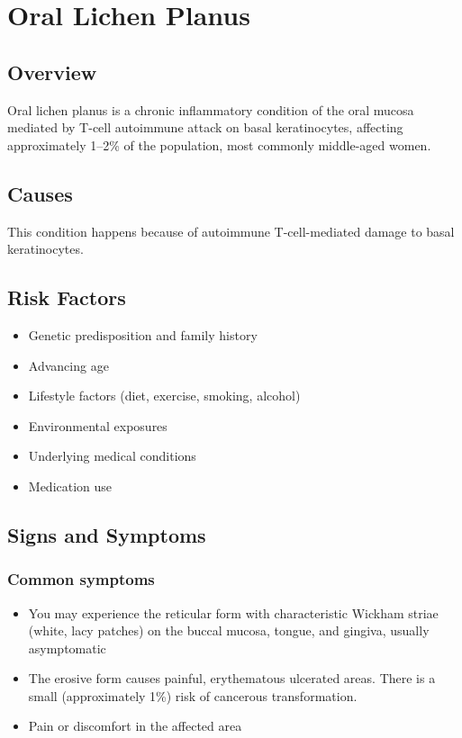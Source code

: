 \chapter{Oral Lichen Planus}
\label{sec:Oral Lichen Planus}

\section{Overview}
Oral lichen planus is a chronic inflammatory condition of the oral mucosa mediated by T-cell autoimmune attack on basal keratinocytes, affecting approximately 1--2\% of the population, most commonly middle-aged women.
\section{Causes}
This condition happens because of autoimmune T-cell-mediated damage to basal keratinocytes.     
\section{Risk Factors}

\begin{itemize}[noitemsep]
  \item Genetic predisposition and family history
  \item Advancing age
  \item Lifestyle factors (diet, exercise, smoking, alcohol)
  \item Environmental exposures
  \item Underlying medical conditions
  \item Medication use
\end{itemize}
\section{Signs and Symptoms}

\subsection{Common symptoms}
\begin{itemize}[noitemsep]
  \item You may experience the reticular form with characteristic Wickham striae (white, lacy patches) on the buccal mucosa, tongue, and gingiva, usually asymptomatic
  \item The erosive form causes painful, erythematous ulcerated areas. There is a small (approximately 1\%) risk of cancerous transformation.
  \item Pain or discomfort in the affected area
  \end{itemize}

